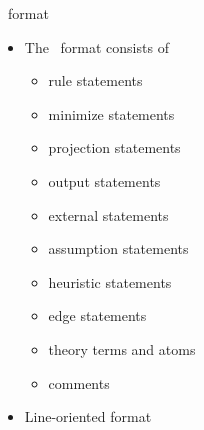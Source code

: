 \begin{frame}{\aspif\ format}
  \begin{itemize}
  \item The \aspif\ format consists of
    \begin{itemize}
    \item rule statements
    \item minimize statements
    \item projection statements
    \item output statements
    \item external statements
    \item assumption statements
    \item heuristic statements
    \item edge statements
    \item theory terms and atoms
    \item comments
    \end{itemize}
  \item Line-oriented format
  \end{itemize}
\end{frame}
